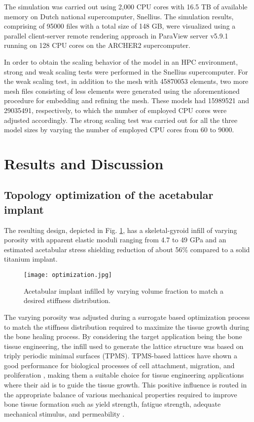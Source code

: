 The simulation was carried out using 2,000 CPU cores with 16.5 TB of available memory on Dutch national supercomputer, Snellius. The simulation results, comprising of \num{95000} files with a total size of 148 GB, were visualized using a parallel client-server remote rendering approach in ParaView server v5.9.1 running on 128 CPU cores on the ARCHER2 supercomputer.

In order to obtain the scaling behavior of the model in an HPC environment, strong and weak scaling tests were performed in the Snellius supercomputer. For the weak scaling test, in addition to the mesh with \num{45870053} elements, two more mesh files consisting of less elements were generated using the aforementioned procedure for embedding and refining the mesh. These models had \num{15989521} and \num{29035491}, respectively, to which the number of employed CPU cores were adjusted accordingly. The strong scaling test was carried out for all the three model sizes by varying the number of employed CPU cores from 60 to \num{9000}.


\section{Results and Discussion}

\subsection{Topology optimization of the acetabular implant}

The resulting design, depicted in Fig. \ref{fig:cup_optimization},  has a skeletal-gyroid infill of varying porosity with apparent elastic moduli ranging from 4.7 to 49 GPa and an estimated acetabular stress shielding reduction of about 56\% compared to a solid titanium implant.

\begin{figure}[h]
\centering
\medskip
\texttt{[image: optimization.jpg]}
\caption[Infilled acetabular implant]{Acetabular implant infilled by varying volume fraction to match a desired stiffness distribution.} \label{fig:cup_optimization}
\end{figure}

The varying porosity was adjusted during a surrogate based optimization process to match the stiffness distribution required to maximize the tissue growth during the bone healing process. By considering the target application being the bone tissue engineering, the infill used to generate the lattice structure was based on triply periodic minimal surfaces (TPMS). TPMS-based lattices have shown a good performance for biological processes of cell attachment, migration, and proliferation \cite{RAJAGOPALAN2006}, making them a suitable choice for tissue engineering applications where their aid is to guide the tissue growth. This positive influence is routed in the appropriate balance of various mechanical properties required to improve bone tissue formation such as yield strength, fatigue strength, adequate mechanical stimulus, and permeability \cite{OtextquotesingleBrien2011,Hollister2005}.

